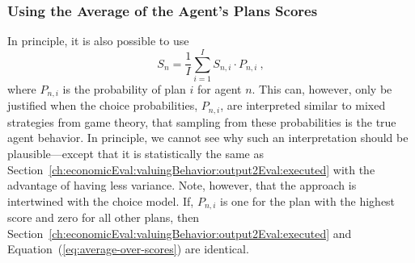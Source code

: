 %

\subsubsection{Using the Average of the Agent's Plans Scores}
\label{ch:economicEval:valuingBehavior:output2Eval:average}
In principle, it is also possible to use
%
\begin{equation}
S_n = \frac{1}{I} \sum_{i=1}^I S_{n,i} \cdot P_{n,i} \ ,
\label{eq:average-over-scores}
\end{equation}
%
where $P_{n,i}$ is the probability of plan $i$ for agent $n$. This can, however, only be justified when the choice probabilities, $P_{n,i}$, are interpreted similar to mixed strategies from game theory, \ie that sampling from these probabilities is the true agent behavior.  In principle, we cannot see why such an interpretation should be plausible---except that it is statistically the same as Section~\ref{ch:economicEval:valuingBehavior:output2Eval:executed} with the advantage of having less variance.  Note, however, that the approach is intertwined with the choice model. If, \eg $P_{n,i}$ is one for the plan with the highest score and zero for all other plans, then Section~\ref{ch:economicEval:valuingBehavior:output2Eval:executed} and Equation~(\ref{eq:average-over-scores}) are identical.  

